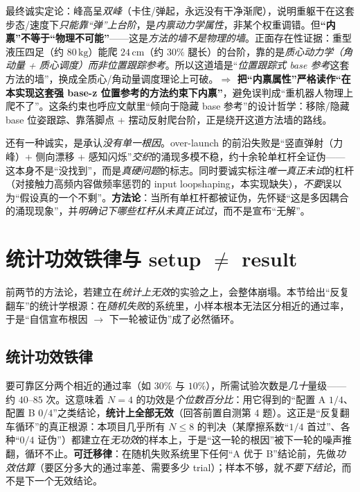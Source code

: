 \begin{insight}\label{ins:ld-method-wall}
最终诚实定论：峰高呈\emph{双峰}（卡住/弹起，永远没有干净渐爬），说明重躯干在这套步态/速度下\emph{只能靠“弹”上台阶}，是\emph{内禀动力学属性}，非某个权重调错。但\textbf{“内禀”不等于“物理不可能”}——这是\emph{方法的墙不是物理的墙}。正面存在性证据：重型液压四足（约 $80\,\mathrm{kg}$）能爬 $24\,\mathrm{cm}$（约 $30\%$ 腿长）的台阶，靠的是\emph{质心动力学（角动量 + 质心调度）而非位置跟踪参考}。所以这道墙是“\emph{位置跟踪式 base 参考}这套方法的墙”，换成全质心/角动量调度理论上可破。\textbf{$\Rightarrow$ 把“内禀属性”严格读作“在本实现这套强 base-z 位置参考的方法约束下内禀”}，避免误判成“重机器人物理上爬不了”。这条约束也呼应文献里“倾向于隐藏 base 参考”的设计哲学：移除/隐藏 base 位姿跟踪、靠落脚点 + 摆动反射爬台阶\cite{corberes2023stairs,jenelten2023dtc}，正是绕开这道方法墙的路线。
\end{insight}

\begin{insight}\label{ins:ld-emergent}
还有一种诚实，是承认\emph{没有单一根因}。over-launch 的前沿失败是“竖直弹射（力峰）+ 侧向漂移 + 感知闪烁”\emph{交织}的涌现多模不稳，约十余轮单杠杆全证伪——这本身不是“没找到”，而是\emph{真硬问题}的标志。同时要诚实标注\emph{唯一真正未试}的杠杆（对接触力高频内容做频率惩罚的 input loopshaping，本实现缺失），\emph{不要}误以为“假设真的一个不剩”。\textbf{方法论}：当所有单杠杆都被证伪，先怀疑“这是多因耦合的涌现现象”，并\emph{明确记下哪些杠杆从未真正试过}，而不是宣布“无解”。
\end{insight}

\section{统计功效铁律与 setup \texorpdfstring{$\ne$}{!=} result}
\label{sec:ld-power}

前两节的方法论，若建立在\emph{统计上无效}的实验之上，会整体崩塌。本节给出“反复翻车”的统计学根源：在\emph{随机失败}的系统里，小样本根本无法区分相近的通过率，于是“自信宣布根因 $\to$ 下一轮被证伪”成了必然循环。

\subsection{统计功效铁律}
\label{subsec:ld-power-law}

\begin{insight}\label{ins:ld-power}
要可靠区分两个相近的通过率（如 $30\%$ 与 $10\%$），所需试验次数是\emph{几十}量级——约 $40\text{--}85$ 次。这意味着 $N=4$ 的功效是\emph{个位数百分比}：用它得到的“配置 A $1/4$、配置 B $0/4$”之类结论，\textbf{统计上全部无效}（回答前置自测第 4 题）。这正是“反复翻车循环”的真正根源：本项目几乎所有 $N\le 8$ 的判决（某摩擦系数“$1/4$ 首过”、各种“$0/4$ 证伪”）都建立在\emph{无功效}的样本上，于是“这一轮的根因”被下一轮的噪声推翻，循环不止。\textbf{可迁移律}：在随机失败系统里下任何“A 优于 B”结论前，先做\emph{功效估算}（要区分多大的通过率差、需要多少 trial）；样本不够，就\emph{不要下结论}，而不是下一个无效结论。
\end{insight}

